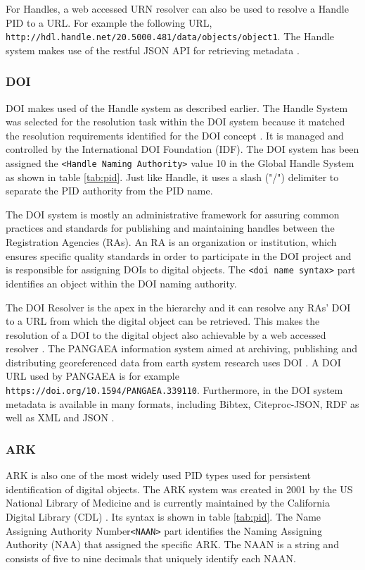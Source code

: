 For Handles, a web accessed URN resolver can also be used to resolve a Handle PID to a URL. For example the following URL, \texttt{http://hdl.handle.net/20.5000.481/data/objects/object1}. The Handle system makes use of the restful JSON API for retrieving metadata \cite{hdl-api}.


\subsubsection{DOI}\label{doi}
DOI makes used of the Handle system as described earlier. The Handle System was selected for the resolution task within the DOI system because it matched the resolution requirements identified for the DOI concept \cite{doi-found}. It is managed and
controlled by the International DOI Foundation (IDF). The DOI system has been assigned the \texttt{<Handle Naming Authority>} value 10 in the Global Handle System as shown in table \ref{tab:pid}. Just like Handle, it uses a slash ("/") delimiter to separate the PID authority from the PID name.

The DOI system is mostly an administrative framework for assuring common practices and standards for publishing and maintaining handles between the Registration Agencies (RAs). An RA is an organization or institution, which ensures specific quality standards in order to participate in the DOI project and is responsible for assigning DOIs to digital objects. 
The \texttt{<doi name syntax>} part identifies an object within the DOI naming authority. 

The DOI Resolver is the apex in the hierarchy and it can resolve any RAs' DOI to a URL from which the digital object can be retrieved. 
This makes the resolution of a DOI to the digital object also achievable by a web accessed resolver \cite{icn-bd}. The PANGAEA information system aimed at archiving, publishing and distributing georeferenced data from earth system research uses DOI \cite{pang}. A DOI URL used by PANGAEA is for example \texttt{https://doi.org/10.1594/PANGAEA.339110}.
Furthermore, in the DOI system metadata is available in many formats, including Bibtex, Citeproc-JSON, RDF as well as XML and JSON \cite{doi-met}.

\subsubsection{ARK}
ARK is also one of the most widely used PID types used for persistent identification of digital objects. The ARK system was created in 2001 by the US National Library of Medicine and is currently maintained by the California Digital Library (CDL) \cite{ark-typ}. Its syntax is shown in table \ref{tab:pid}. The Name Assigning Authority Number\texttt{<NAAN>} part identifies the Naming Assigning Authority (NAA) that assigned the specific ARK. The NAAN is a string and consists of five to nine decimals that uniquely identify each NAAN.

